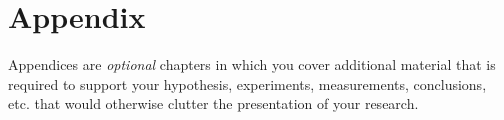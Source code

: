 \chapter{Appendix}
Appendices are \emph{optional} chapters in which you cover additional material that is required to support your
hypothesis, experiments, measurements, conclusions, etc. that would otherwise
clutter the presentation of your research.
